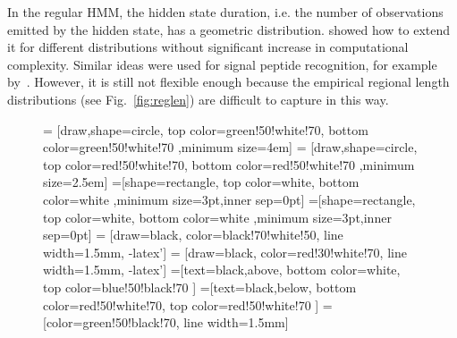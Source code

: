 \documentclass[10pt,letterpaper]{article}
\begin{document}
In the regular HMM, the hidden state duration, i.e. the number of observations emitted by the hidden state, has a geometric distribution. \cite{Durbin98biologicalsequence} showed how to extend it for different distributions without significant increase in computational 
complexity. Similar ideas were used for signal peptide recognition, for example by~\cite{2004klla}. 
However, it is still not flexible enough because the empirical regional length distributions (see Fig.~\ref{fig:reglen})
are difficult to capture in this way.

\begin{figure}[h]
\centering
{} = [draw,shape=circle, top color=green!50!white!70, bottom color=green!50!white!70 ,minimum size=4em]
 = [draw,shape=circle, top color=red!50!white!70, bottom color=red!50!white!70 ,minimum size=2.5em]
\def\radius{.7mm} 
=[shape=rectangle, top color=white, bottom color=white ,minimum size=3pt,inner sep=0pt]
=[shape=rectangle, top color=white, bottom color=white ,minimum size=3pt,inner sep=0pt]
\def\n{11}
  = [draw=black, color=black!70!white!50, line width=1.5mm, -latex'] 
  = [draw=black, color=red!30!white!70, line width=1.5mm, -latex']
=[text=black,above, bottom color=white, top color=blue!50!black!70  ]
=[text=black,below, bottom color=red!50!white!70, top color=red!50!white!70  ]
  = [color=green!50!black!70, line width=1.5mm]
\def\names{{"$O_{1,1}$","...","$O_{1,d_1}$", "...","$O_{k, 1}$", "...", "$O_{k, d_k}$"}}%
%  

\end{figure}
\end{document}
